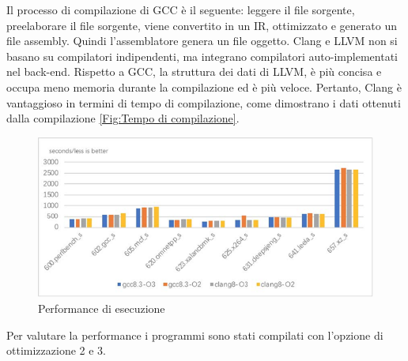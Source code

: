 \documentclass[12pt,a4paper]{report}
\begin{document}
Il processo di compilazione di GCC è il seguente: leggere il file sorgente, preelaborare il file sorgente, viene convertito in un IR, ottimizzato e generato un file assembly. Quindi l'assemblatore genera un file oggetto. 
Clang e LLVM non si basano su compilatori indipendenti, ma integrano compilatori auto-implementati nel back-end.  Rispetto a GCC, la struttura dei dati di LLVM, è più concisa e occupa meno memoria durante la compilazione ed è più veloce.  Pertanto, Clang  è vantaggioso in termini di tempo di compilazione, come dimostrano i dati ottenuti dalla compilazione \ref{Fig:Tempo di compilazione}.


\begin{figure}[h]
\centering
 \includegraphics[scale=0.4]{CompilatoriGrafici/exeComparison.png}
 \caption{Performance di esecuzione}
 \label{Fig:Performance di esecuzione}
\end{figure}
Per valutare la performance i programmi sono stati compilati con l'opzione di ottimizzazione 2 e 3.
\end{document}
